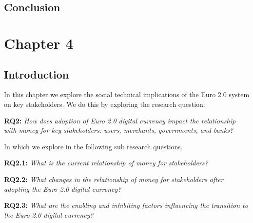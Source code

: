 \documentclass[a4paper,12pt]{article} %
\begin{document}
{

\subsection{Conclusion} \label{ssec:3.7}


\pagebreak

\section{Chapter 4} \label{sec:4}

\subsection{Introduction} \label{ssec:4.1}

In this chapter we explore the social technical implications of the Euro 2.0 system on key stakeholders. We do this by exploring the research question:

\begin{quoting}
	\textbf{RQ2:} \textit{How does adoption of Euro 2.0 digital currency impact the relationship with money for key stakeholders: users, merchants, governments, and banks?}
\end{quoting}

In which we explore in the following sub research questions.

\begin{quoting}
	\textbf{RQ2.1:} \textit{What is the current relationship of money for stakeholders?}
\end{quoting}
\begin{quoting}
	\textbf{RQ2.2:} \textit{What changes in the relationship of money for stakeholders after adopting the Euro 2.0 digital currency?}
\end{quoting}
\begin{quoting}
	\textbf{RQ2.3:} \textit{What are the enabling and inhibiting factors influencing the transition to the Euro 2.0 digital currency?}
\end{quoting}

}
\end{document}
